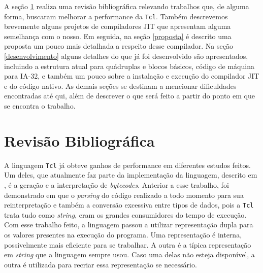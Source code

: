 A seção \ref{rev_biblio} realiza uma revisão bibliográfica relevando
trabalhos que, de alguma forma, buscaram melhorar a performance da
\texttt{Tcl}. Também descrevemos brevemente alguns projetos de
compiladores JIT que apresentam alguma semelhança com o nosso. Em
seguida, na seção \ref{proposta} é descrito uma proposta um pouco mais
detalhada a respeito desse compilador. Na seção \ref{desenvolvimento}
alguns detalhes do que já foi desenvolvido são apresentados, incluindo a
estrutura atual para quádruplas e blocos básicos, código de máquina
para IA-32, e também um pouco sobre a instalação e execução do
compilador JIT e do código nativo. As demais seções
se destinam a mencionar dificuldades encontradas até qui, além de
descrever o que será feito a partir do ponto em que se encontra o
trabalho.


\section{Revisão Bibliográfica}
\label{rev_biblio}

A linguagem \texttt{Tcl} já obteve ganhos de performance em diferentes
estudos feitos. Um deles, que atualmente faz parte da implementação da
linguagem, descrito em , é a geração e a
interpretação de \textit{bytecodes}. Anterior a esse trabalho, foi
demonstrado em  que o \textit{parsing} do código
realizado a todo momento para sua reinterpretação e também a conversão
excessiva entre tipos de dados, pois a \texttt{Tcl} trata tudo como
\textit{string},
eram os grandes consumidores do tempo de execução. Com esse trabalho
feito, a linguagem passou a utilizar representação dupla para os
valores presentes na execução do programa. Uma representação é
interna, possivelmente mais eficiente para se trabalhar. A outra é a
típica representação em \textit{string} que a linguagem sempre usou. Caso uma
delas não esteja disponível, a outra é utilizada para recriar essa
representação se necessário.


